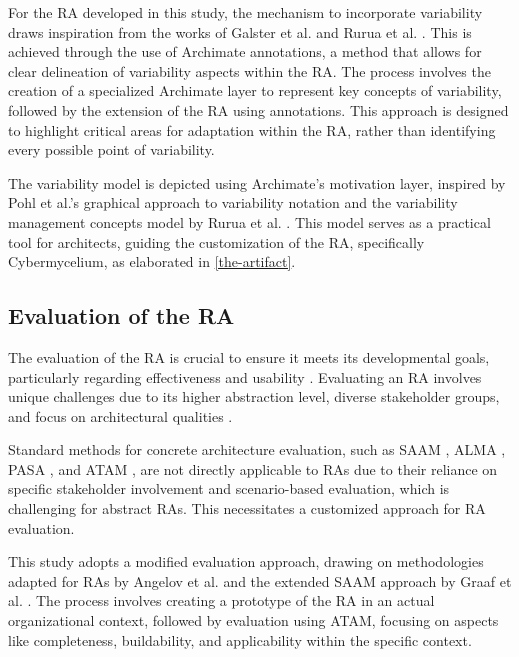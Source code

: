 \documentclass[review]{elsarticle}
\begin{document}
For the RA developed in this study, the mechanism to incorporate variability draws inspiration from the works of Galster et al. \cite{galster2011empirically} and Rurua et al. \cite{rurua2019representing}. This is achieved through the use of Archimate annotations, a method that allows for clear delineation of variability aspects within the RA. The process involves the creation of a specialized Archimate layer to represent key concepts of variability, followed by the extension of the RA using annotations. This approach is designed to highlight critical areas for adaptation within the RA, rather than identifying every possible point of variability.

The variability model is depicted using Archimate's motivation layer, inspired by Pohl et al.'s graphical approach to variability notation \cite{pohl2005software} and the variability management concepts model by Rurua et al. \cite{rurua2019representing}. This model serves as a practical tool for architects, guiding the customization of the RA, specifically Cybermycelium, as elaborated in \ref{the-artifact}.


\subsection{Evaluation of the RA}

The evaluation of the RA is crucial to ensure it meets its developmental goals, particularly regarding effectiveness and usability \cite{galster2011empirically}. Evaluating an RA involves unique challenges due to its higher abstraction level, diverse stakeholder groups, and focus on architectural qualities \cite{angelov2008contracting, Avgeriou, Cioroaica, Maier}.

Standard methods for concrete architecture evaluation, such as SAAM \cite{kazman1994saam}, ALMA \cite{Bengtsson}, PASA \cite{Williams}, and ATAM \cite{KazmanATAM}, are not directly applicable to RAs due to their reliance on specific stakeholder involvement and scenario-based evaluation, which is challenging for abstract RAs. This necessitates a customized approach for RA evaluation.

This study adopts a modified evaluation approach, drawing on methodologies adapted for RAs by Angelov et al. \cite{angelov2008towards} and the extended SAAM approach by Graaf et al. \cite{graaf2005evaluating}. The process involves creating a prototype of the RA in an actual organizational context, followed by evaluation using ATAM, focusing on aspects like completeness, buildability, and applicability within the specific context.
\end{document}
